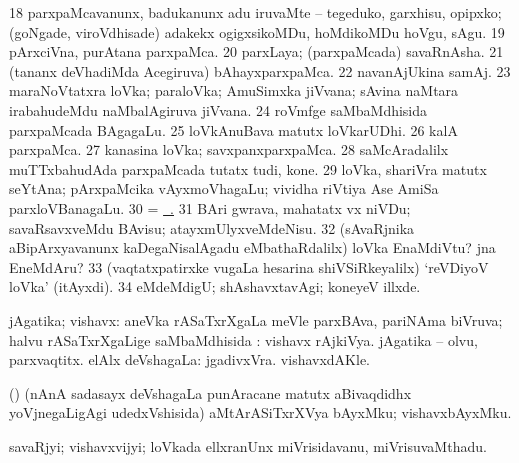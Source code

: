 {{{{{{\begin{center}
\eanum
\numie
\num{18}  parxpaMcavanunx, badukanunx adu iruvaMte -- tegeduko, garxhisu, opipxko; (goNgade, viroVdhisade) adakekx ogigxsikoMDu, hoMdikoMDu hoVgu, sAgu. 
\num{19}  pArxciVna, purAtana parxpaMca. 
\num{20}  parxLaya; (parxpaMcada) savaRnAsha. 
\num{21}  (tananx deVhadiMda Acegiruva) bAhayxparxpaMca. 
\num{22}  navanAjUkina samAj. 
\hypertarget{world pagu23}{} 
\num{23}  maraNoVtatxra loVka; paraloVka; AmuSimxka jiVvana; sAvina naMtara irabahudeMdu naMbalAgiruva jiVvana. 
\num{24}  roVmfge saMbaMdhisida parxpaMcada BAgagaLu. 
\num{25}  loVkAnuBava matutx loVkarUDhi. 
\num{26}  kalA parxpaMca. 
\num{27}  kanasina loVka; savxpanxparxpaMca. 
\num{28}  saMcAradalilx muTTxbahudAda parxpaMcada tutatx tudi, kone. 
\num{29}  loVka, shariVra matutx seYtAna; pArxpaMcika vAyxmoVhagaLu; vividha riVtiya Ase AmiSa parxloVBanagaLu. 
\num{30}  = \hyperlink{world pagu23}{\pagu\ .} 
\num{31}  BAri gwrava, mahatatx vx niVDu; savaRsavxveMdu BAvisu; atayxmUlyxveMdeNisu. 
\num{32}  (sAvaRjnika aBipArxyavanunx kaDegaNisalAgadu eMbathaRdalilx) loVka EnaMdiVtu? jna EneMdAru? 
\num{33}  (vaqtatxpatirxke \mo vugaLa hesarina shiVSiRkeyalilx) `reVDiyoV loVka' (itAyxdi). 
\num{34}  eMdeMdigU; shAshavxtavAgi; koneyeV illxde. 
\enum
\emng
\eentry

\bentry
{} 
\gl{\gu}
\expl{}
\bmng
jAgatika; vishavx: 
\banum
{} aneVka rASaTxrXgaLa meVle parxBAva, pariNAma biVruva; halvu rASaTxrXgaLige saMbaMdhisida :  vishavx rAjkiVya.  jAgatika -- olvu, parxvaqtitx. 
 elAlx deVshagaLa:  jgadivxVra.  vishavxdAKle. 
\eanum
\emng
\eentry

\bentry
{} 
\gl{\nA}
\expl{}
\bmng
(\AmA) (nAnA sadasayx deVshagaLa punAracane matutx aBivaqdidhx yoVjnegaLigAgi udedxVshisida) aMtArASiTxrXVya bAyxMku; vishavxbAyxMku. 
\emng
\eentry

\bentry
{} 
\gl{\nA}
\expl{}
\bmng
savaRjyi; vishavxvijyi; loVkada ellxranUnx miVrisidavanu, miVrisuvaMthadu. 
\emng
\eentry


\end{center}}}}}}}
